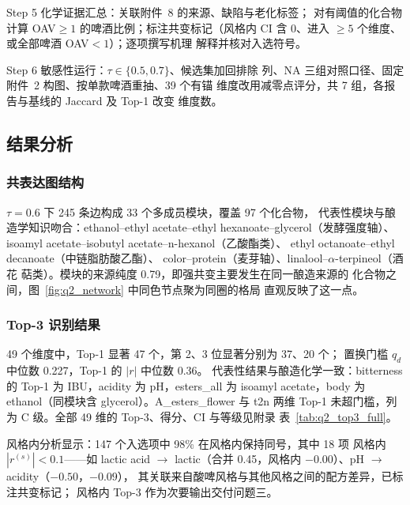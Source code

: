 \documentclass[12pt,a4paper]{article}
\begin{document}
Step 5 化学证据汇总：关联附件~8 的来源、缺陷与老化标签；
对有阈值的化合物计算 OAV$\ge1$ 的啤酒比例；标注共变标记（风格内
CI 含 0、进入 $\ge5$ 个维度、或全部啤酒 OAV$<1$）；逐项撰写机理
解释并核对入选符号。

Step 6 敏感性运行：$\tau\in\{0.5,0.7\}$、候选集加回排除
列、NA 三组对照口径、固定附件~2 构图、按单款啤酒重抽、39 个有锚
维度改用减零点评分，共 7 组，各报告与基线的 Jaccard 及 Top-1 改变
维度数。

\subsection{结果分析}

\subsubsection{共表达图结构}

$\tau=0.6$ 下 245 条边构成 33 个多成员模块，覆盖 97 个化合物，
代表性模块与酿造学知识吻合：ethanol--ethyl acetate--ethyl hexanoate--glycerol（发酵强度轴）、
isoamyl acetate--isobutyl acetate--n-hexanol（乙酸酯类）、
ethyl octanoate--ethyl decanoate（中链脂肪酸乙酯）、
color--protein（麦芽轴）、linalool--$\alpha$-terpineol（酒花
萜类）。模块的来源纯度 0.79，即强共变主要发生在同一酿造来源的
化合物之间，图~\ref{fig:q2_network} 中同色节点聚为同圈的格局
直观反映了这一点。


\subsubsection{Top-3 识别结果}

49 个维度中，Top-1 显著 47 个，第 2、3 位显著分别为 37、20 个；
置换门槛 $q_d$ 中位数 0.227，Top-1 的 $|r|$ 中位数 0.36。
代表性结果与酿造化学一致：bitterness 的 Top-1 为 IBU，acidity 为
pH，esters\_all 为 isoamyl acetate，body 为 ethanol（同模块含
glycerol）。A\_esters\_flower 与 t2n 两维 Top-1 未超门槛，列为
C 级。全部 49 维的 Top-3、得分、CI 与等级见附录
表~\ref{tab:q2_top3_full}。

风格内分析显示：147 个入选项中 98\% 在风格内保持同号，其中 18 项
风格内 $|r^{(s)}|<0.1$——如 lactic acid $\to$ lactic（合并
0.45，风格内 $-0.00$）、pH $\to$ acidity（$-0.50$，$-0.09$），
其关联来自酸啤风格与其他风格之间的配方差异，已标注共变标记；
风格内 Top-3 作为次要输出交付问题三。
\end{document}
